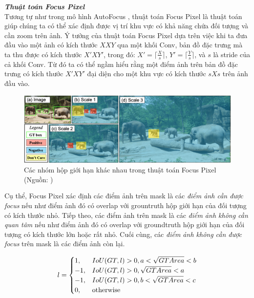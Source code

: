 {    \noindent
    \textbf{\textit{Thuật toán Focus Pixel}} \\
    Tương tự như trong mô hình AutoFocus \cite{najibi2019autofocus}, thuật toán Focus Pixel là thuật toán giúp chúng ta có thể xác định được vị trí khu vực có khả năng chứa đối tượng và cần zoom trên ảnh.
    Ý tưởng của thuật toán Focus Pixel  dựa trên việc khi ta đưa đầu vào một ảnh có kích thước $X X Y$ qua một khối Conv, bản đồ đặc trưng mà ta thu được có kích thước $X' X Y'$, trong đó: $X' = \lceil \frac{X}{s} \rceil$, $Y' = \lceil \frac{Y}{s} \rceil$, và $s$ là stride của cả khối Conv.
    Từ đó ta có thể ngầm hiểu rằng một điểm ảnh trên bản đồ đặc trưng có kích thước $X' X Y'$ đại diện cho một khu vực có kích thước $s X s$ trên ảnh đầu vào.

    \begin{figure}[H]
        \centering
        \includegraphics[width=15cm] {images/autofocus_focus_pixel}
        \caption{Các nhóm hộp giới hạn khác nhau trong thuật toán Focus Pixel (Nguồn: \cite{najibi2019autofocus})}
        \label{fig:autofocus_focus_pixel}
    \end{figure}

    \noindent
    Cụ thể, Focus Pixel  xác định các điểm ảnh trên mask là các \textit{điểm ảnh cần được focus} nếu như điểm ảnh đó có overlap với grountruth hộp giới hạn của đối tượng có kích thước nhỏ.
    Tiếp theo, các điểm ảnh trên mask là các \textit{điểm ảnh không cần quan tâm} nếu như điểm ảnh đó có overlap với groundtruth hộp giới hạn của đối tượng có kích thước lớn hoặc rất nhỏ.
    Cuối cùng, các \textit{điểm ảnh không cần được focus} trên mask là các điểm ảnh còn lại.

    \[l = 
        \begin{cases}
            1, & IoU\index{IoU}(GT, l) > 0, a < \sqrt{GTArea} < b \\
            -1, & IoU\index{IoU}(GT, l) > 0, \sqrt{GTArea} < a  \\
            -1, & IoU\index{IoU}(GT, l) > 0, b < \sqrt{GTArea} < c  \\
            0, & \text{otherwise}
        \end{cases}
    \]

}
